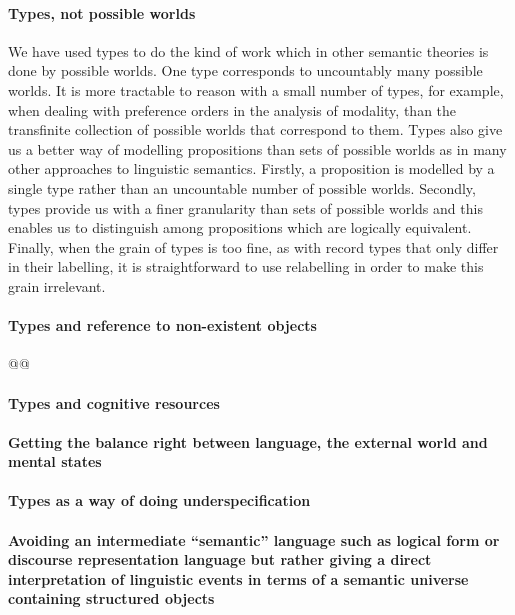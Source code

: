 \paragraph{Types, not possible worlds}  We have used types to do the
kind of work which in other semantic theories is done by possible
worlds.  One type corresponds to uncountably many possible worlds.  It
is more tractable to reason with a small number of types, for example,
when dealing with preference orders in the analysis of modality, than
the transfinite collection of possible worlds that correspond to
them.  Types also give us a better way of modelling propositions than
sets of possible worlds as in many other approaches to linguistic
semantics.  Firstly, a proposition is modelled by a single type rather
than an uncountable number of possible worlds.  Secondly, types
provide us with a finer granularity than sets of possible worlds and this
enables us to distinguish among propositions which are logically
equivalent.  Finally, when the grain of types is too fine, as with
record types that only differ in their labelling, it is
straightforward to use relabelling in order to make this grain irrelevant.

\paragraph{Types and reference to non-existent objects} @@

\paragraph{Types and cognitive resources}

\paragraph{Getting the balance right between language, the external world
  and mental states}

\paragraph{Types as a way of doing underspecification}

\paragraph{Avoiding an intermediate ``semantic'' language such as logical
  form or discourse representation language but rather giving a direct
  interpretation of linguistic events in terms of a semantic
  universe containing structured objects}
 

